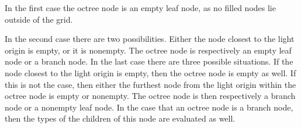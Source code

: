 \noindent In the first case the octree node is an empty leaf node, as no filled nodes lie outside
of the grid.

In the second case there are two possibilities. Either the node closest to the light origin
is empty, or it is nonempty. The octree node is respectively an empty leaf node or a branch node.
In the last case there are three possible situations. If the node closest to the light origin
is empty, then the octree node is empty as well. If this is not the case, then either the furthest
node from the light origin within the octree node is empty or nonempty. The octree node is
then respectively a branch node or a nonempty leaf node. In the case that an octree node is
a branch node, then the types of the children of this node are evaluated as well.






